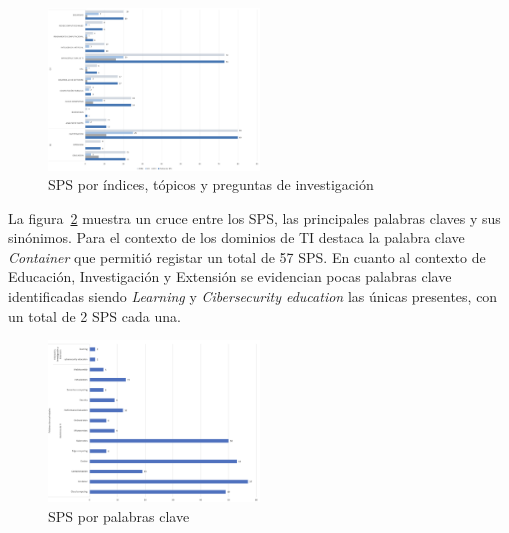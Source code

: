 \begin{figure}[htbp]
    \centering
    \includegraphics[width=0.5\textwidth]{resources/images/resultados/SPS-topics-QI.png}
    \caption{SPS por índices, tópicos y preguntas de investigación}\label{fig:SPS-topics-QI}
\end{figure}
La figura~\ref{fig:SPS-kw} muestra un cruce entre los SPS, las principales palabras claves y sus sinónimos. Para el contexto de los dominios de TI destaca la palabra clave \textit{Container} que permitió registar un total de 57 SPS. En cuanto al contexto de Educación, Investigación y Extensión se evidencian pocas palabras clave identificadas siendo \textit{Learning} y \textit{Cibersecurity education} las únicas presentes, con un total de 2 SPS cada una. \\
\begin{figure}[htbp]
    \centering
    \includegraphics[width=0.5\textwidth]{resources/images/resultados/Kw.png}
    \caption{SPS por palabras clave}\label{fig:SPS-kw}
\end{figure}
\mbox{}\\
